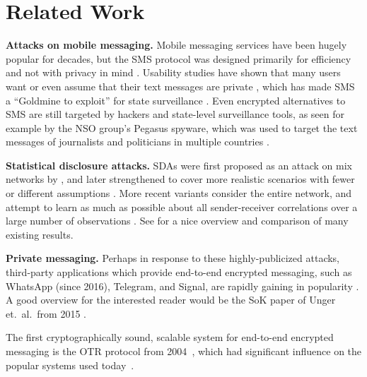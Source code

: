\section{Related Work}\label{sec:signal-related_work}

\noindent
\textbf{Attacks on mobile messaging.}
Mobile messaging services have been hugely popular for decades, but the
SMS protocol was designed primarily for efficiency and not with
privacy in mind \cite{smsbook}. Usability studies have shown that many
users want or even assume that their text messages are private
\cite{HakCha05}, which has made SMS a ``Goldmine to exploit'' for state
surveillance \cite{Ball14,Fif19}. Even encrypted alternatives to SMS are
still targeted by hackers and state-level surveillance tools, as seen
for example by the NSO group's Pegasus spyware, which was used to
target the text messages of journalists and politicians in multiple
countries \cite{MSMRD18}.

\medskip\noindent
\textbf{Statistical disclosure attacks.}
SDAs were first proposed as an attack on mix networks by \cite{SDA}, and
later strengthened to cover more realistic scenarios with fewer or
different assumptions \cite{SDA-MD05,reverse-SDA,two-sided-SDA}.
More recent variants consider the entire network, and attempt to
learn as much as possible about all sender-receiver correlations over a
large number of observations \cite{vida-SDA,LSDA,mix-limits}.
See \cite{meet-sdas} for a nice overview and comparison of many existing
results.

\medskip \noindent
\textbf{Private messaging.}\label{sec:signal-relwork-msging}
Perhaps in response to these highly-publicized attacks, third-party
applications which provide end-to-end encrypted messaging, such as
WhatsApp (since 2016), Telegram, and Signal, are rapidly gaining in
popularity \cite{Lab18}. A good overview for the interested reader
would be the  SoK paper of Unger et.\ al.\ from 2015 \cite{U+15}.

The first cryptographically sound, scalable system for end-to-end
encrypted messaging is the OTR protocol from 2004~\cite{BGB04}, which had
significant influence on the popular systems used today~\cite{Mar13,F+16,C+17}.


